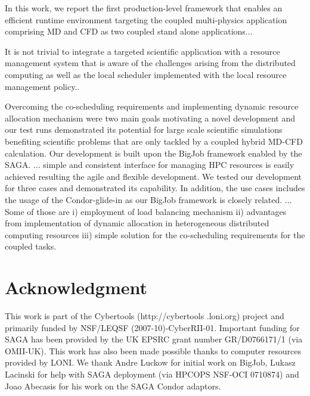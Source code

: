 \documentclass[conference,final]{IEEEtran}
\begin{document}
In this work, we report the first production-level framework that
enables an efficient runtime environment targeting the coupled
multi-physics application comprising MD and CFD as two coupled stand
alone applications...

It is not trivial to integrate a targeted scientific application with
a resource management system that is aware of the challenges arising
from the distributed computing as well as the local scheduler
implemented with the local resource management policy..

Overcoming the co-scheduling requirements and implementing dynamic
resource allocation mechanism were two main goals motivating a novel
development and our test runs demonstrated its potential for large
scale scientific simulations benefiting scientific problems that are
only tackled by a coupled hybrid MD-CFD calculation.  Our development
is built upon the BigJob framework enabled by the SAGA. ... simple and
consistent interface for managing HPC resources is easily achieved
resulting the agile and flexible development. We tested our
development for three cases and demonstrated its capability. In
addition, the use cases includes the usage of the Condor-glide-in as
our BigJob framework is closely related. ... Some of those are i)
employment of load balancing mechanism ii) advantages from
implementation of dynamic allocation in heterogeneous distributed
computing resources iii) simple solution for the co-scheduling
requirements for the coupled tasks.

\section*{Acknowledgment}
This work is part of the Cybertools (http://cybertools .loni.org)
project and primarily funded by NSF/LEQSF (2007-10)-CyberRII-01.
Important funding for SAGA has been provided by the UK EPSRC grant
number GR/D0766171/1 (via OMII-UK). This work has also been made
possible thanks to computer resources provided by LONI. We thank Andre
Luckow for initial work on BigJob, Lukasz Lacinski for help with SAGA
deployment (via HPCOPS NSF-OCI 0710874) and Joao Abecasis for his work
on the SAGA Condor adaptors.

\nocite{ex1,ex2}
%


\end{document}
